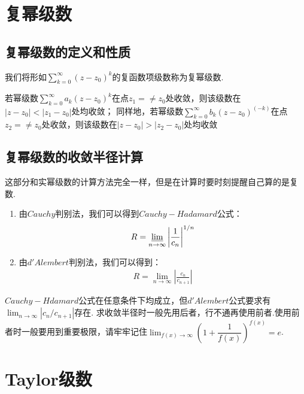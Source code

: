 \section{复幂级数}
    \subsection{复幂级数的定义和性质}
        \begin{definition}[复幂级数]\label{def:complex_power_series}
            我们将形如$\sum_{k=0}^{\infty}(z-z_0)^k$的复函数项级数称为复幂级数.
        \end{definition}

        \begin{proposition}
            若幂级数$\sum_{k=0}^{\infty}a_k(z - z_0)^k$在点$z_1=\neq z_0$处收敛，则该级数在$|z-z_0|<|z_1-z_0|$处均收敛；
            同样地，若幂级数$\sum_{k=0}^{\infty}b_k(z - z_0)^{(-k)}$在点$z_2=\neq z_0$处收敛，则该级数在$|z-z_0|>|z_2-z_0|$处均收敛
        \end{proposition}

    \subsection{复幂级数的收敛半径计算}
        这部分和实幂级数的计算方法完全一样，但是在计算时要时刻提醒自己算的是复数.
        \begin{enumerate}
            \item 由$Cauchy$判别法，我们可以得到$Cauchy-Hadamard$公式：
                \begin{align}
                    R=\varliminf_{n\to\infty}\left|\frac{1}{c_n}\right|^{1/n}
                \end{align}
            \item 由$d'Alembert$判别法，我们可以得到：
                \begin{align}
                    R=\lim_{n\to\infty}\left|\frac{c_n}{c_{n+1}}\right|
                \end{align}
        \end{enumerate}
        \begin{remark}
            $Cauchy-Hdamard$公式在任意条件下均成立，但$d'Alembert$公式要求有$\lim_{n\to\infty}|c_n/c_{n+1}|$存在.
            求收敛半径时一般先用后者，行不通再使用前者.使用前者时一般要用到重要极限，请牢牢记住$\lim_{f(x)\to\infty}\left(1+\dfrac{1}{f(x)}\right)^{f(x)}=e$.
        \end{remark}

\section{Taylor级数}
